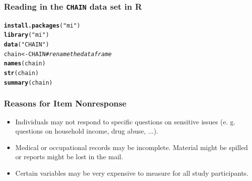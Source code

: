 \documentclass{beamer}\usepackage[]{graphicx}\usepackage[]{color}
\makeatletter
\newcommand{\hlnum}[1]{\textcolor[rgb]{0.686,0.059,0.569}{#1}}%
\newcommand{\hlstr}[1]{\textcolor[rgb]{0.192,0.494,0.8}{#1}}%
\newcommand{\hlcom}[1]{\textcolor[rgb]{0.678,0.584,0.686}{\textit{#1}}}%
\newcommand{\hlopt}[1]{\textcolor[rgb]{0,0,0}{#1}}%
\newcommand{\hlstd}[1]{\textcolor[rgb]{0.345,0.345,0.345}{#1}}%
\newcommand{\hlkwa}[1]{\textcolor[rgb]{0.161,0.373,0.58}{\textbf{#1}}}%
\newcommand{\hlkwb}[1]{\textcolor[rgb]{0.69,0.353,0.396}{#1}}%
\newcommand{\hlkwc}[1]{\textcolor[rgb]{0.333,0.667,0.333}{#1}}%
\newcommand{\hlkwd}[1]{\textcolor[rgb]{0.737,0.353,0.396}{\textbf{#1}}}%
\newenvironment{kframe}{%
 \def\at@end@of@kframe{}%
 \ifinner\ifhmode%
  \def\at@end@of@kframe{\end{minipage}}%
  \begin{minipage}{\columnwidth}%
 \fi\fi%
 \def\FrameCommand##1{\hskip\@totalleftmargin \hskip-\fboxsep
 \colorbox{shadecolor}{##1}\hskip-\fboxsep
     \hskip-\linewidth \hskip-\@totalleftmargin \hskip\columnwidth}%
 \MakeFramed {\advance\hsize-\width
   \@totalleftmargin\z@ \linewidth\hsize
   \@setminipage}}%
 {\par\unskip\endMakeFramed%
 \at@end@of@kframe}
\newenvironment{knitrout}{}{} %
\makeatother
\begin{document}
\begin{frame}[fragile]
\frametitle{Reading in the \texttt{CHAIN} data set in R}


\begin{knitrout}
\color{fgcolor}\begin{kframe}
\begin{alltt}
\hlkwd{install.packages}\hlstd{(}\hlstr{"mi"}\hlstd{)}
\hlkwd{library}\hlstd{(}\hlstr{"mi"}\hlstd{)}
\hlkwd{data}\hlstd{(}\hlstr{"CHAIN"}\hlstd{)}
\hlstd{chain} \hlkwb{<-} \hlstd{CHAIN} \hlcom{# rename the data frame}
\hlkwd{names}\hlstd{(chain)}
\hlkwd{str}\hlstd{(chain)}
\hlkwd{summary}\hlstd{(chain)}
\end{alltt}
\end{kframe}
\end{knitrout}
\end{frame}


\usebackgroundtemplate{}
\begin{frame}
\frametitle{Reasons for Item Nonresponse}
\begin{itemize}
\item Individuals may not respond to specific questions on sensitive issues
(e. g. questions on household income, drug abuse, ...).
\item Medical or occupational records may be incomplete.
Material might be spilled or reports might be lost in the mail.
\item Certain variables may be very expensive to measure for all study
participants.
\end{itemize}
\end{frame}
\end{document}
